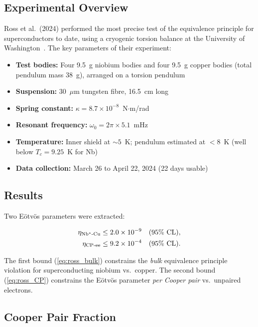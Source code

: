 \documentclass[12pt,a4paper]{article}
\theoremstyle{definition}
\theoremstyle{remark}
\begin{document}
\subsection{Experimental Overview}

Ross et al.\ (2024) performed the most precise test of the equivalence principle
for superconductors to date, using a cryogenic torsion balance at the University
of Washington~\cite{Ross2024}.  The key parameters of their experiment:

\begin{itemize}
\item \textbf{Test bodies:} Four 9.5~g niobium bodies and four 9.5~g copper
bodies (total pendulum mass 38~g), arranged on a torsion pendulum
\item \textbf{Suspension:} 30~$\mu$m tungsten fibre, 16.5~cm long
\item \textbf{Spring constant:} $\kappa = 8.7 \times 10^{-8}$~N$\cdot$m/rad
\item \textbf{Resonant frequency:} $\omega_0 = 2\pi \times 5.1$~mHz
\item \textbf{Temperature:} Inner shield at $\sim 5$~K; pendulum estimated
at $< 8$~K (well below $T_c = 9.25$~K for Nb)
\item \textbf{Data collection:} March 26 to April 22, 2024 (22 days usable)
\end{itemize}

\subsection{Results}

Two E\"otv\"os parameters were extracted:

\begin{tcolorbox}[title={Ross et al.\ 2024 Results}]
\begin{align}
\eta_{\rm Nb^*\text{-}Cu} &\leq 2.0 \times 10^{-9} \quad (95\%~\text{CL}),
\label{eq:ross_bulk} \\
\eta_{\rm CP\text{-}ee} &\leq 9.2 \times 10^{-4} \quad (95\%~\text{CL}).
\label{eq:ross_CP}
\end{align}
\end{tcolorbox}

The first bound (\ref{eq:ross_bulk}) constrains the \emph{bulk} equivalence
principle violation for superconducting niobium vs.\ copper.  The second bound
(\ref{eq:ross_CP}) constrains the E\"otv\"os parameter \emph{per Cooper pair}
vs.\ unpaired electrons.

\subsection{Cooper Pair Fraction}
\end{document}
